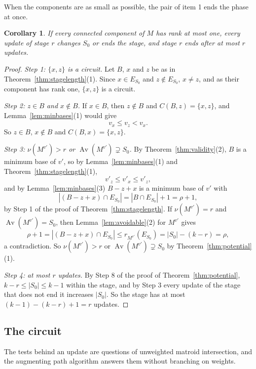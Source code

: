 \documentclass[11pt]{article}
\newtheorem{corollary}[theorem]{Corollary}
\newcommand{\Av}{\operatorname{Av}}
\begin{document}
When the components are as small as possible, the pair of item 1 ends the phase at
once.

\begin{corollary}
\label{cor:rankone}
If every connected component of $M$ has rank at most one, every update of stage $r$
changes $S_0$ or ends the stage, and stage $r$ ends after at most $r$ updates.
\end{corollary}

\begin{proof}
\emph{Step 1: $\{x,z\}$ is a circuit.}  Let $B$, $x$ and $z$ be as in
Theorem~\ref{thm:stagelength}(1).  Since $x\in E_{S_0}$ and $z\notin E_{S_0}$, $x\ne z$, and
as their component has rank one, $\{x,z\}$ is a circuit.

\emph{Step 2: $z\in B$ and $x\notin B$.}  If $x\in B$, then $z\notin B$ and $C(B,z)=\{x,z\}$, and
Lemma~\ref{lem:minbases}(1) would give
\[
  v_x\le v_z<v_x.
\]
So $z\in B$, $x\notin B$ and $C(B,x)=\{x,z\}$.

\emph{Step 3: $\nu(M^{v'})>r$ or $\Av(M^{v'})\supsetneq S_0$.}  By Theorem~\ref{thm:validity}(2), $B$ is a minimum base
of $v'$, so by Lemma~\ref{lem:minbases}(1) and Theorem~\ref{thm:stagelength}(1),
\[
  v'_z\le v'_x\le v'_z,
\]
and by Lemma~\ref{lem:minbases}(3) $B-z+x$ is a minimum base of $v'$ with
\[
  |(B-z+x)\cap E_{S_0}|=|B\cap E_{S_0}|+1=\rho+1,
\]
by Step 1 of the proof of Theorem~\ref{thm:stagelength}.  If $\nu(M^{v'})=r$ and
$\Av(M^{v'})=S_0$, then Lemma~\ref{lem:avoidable}(2) for $M^{v'}$ gives
\[
  \rho+1=|(B-z+x)\cap E_{S_0}|\le r_{M^{v'}}(E_{S_0})=|S_0|-(k-r)=\rho,
\]
a contradiction.  So $\nu(M^{v'})>r$ or $\Av(M^{v'})\supsetneq S_0$ by
Theorem~\ref{thm:potential}(1).

\emph{Step 4: at most $r$ updates.}  By Step 8 of the proof of Theorem~\ref{thm:potential},
$k-r\le|S_0|\le k-1$ within the stage, and by Step 3 every update of the stage
that does not end it increases $|S_0|$.  So the stage has at most
$(k-1)-(k-r)+1=r$ updates.
\end{proof}

\subsection{The circuit}
\label{sec:circuit}

The tests behind an update are questions of unweighted matroid
intersection, and the augmenting path algorithm answers them without branching
on weights.
\end{document}
